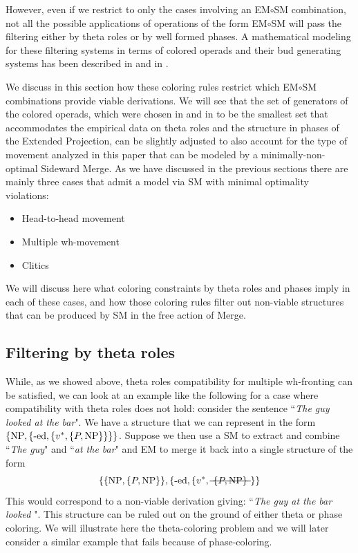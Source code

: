 \documentclass[12pt]{amsart}
\numberwithin{equation}{section}
\begin{document}
\smallskip

However, even if we restrict to only the cases involving an EM$\circ$SM combination, 
not all the possible applications of operations of the form EM$\circ$SM
will pass the filtering either by theta roles or by well formed phases. A mathematical modeling
for these filtering systems in terms of colored operads and their bud generating systems 
has been described in \cite{MarLar} and in \cite{MHL}. 

We discuss in this section how these coloring rules restrict which EM$\circ$SM
combinations provide viable derivations. We will see that the set of generators
of the colored operads, which were chosen in \cite{MarLar} and in \cite{MHL} to
be the smallest set that accommodates the empirical data on theta roles and
the structure in phases of the Extended Projection, can be slightly adjusted to
also account for the type of movement analyzed in this paper that can be
modeled by a minimally-non-optimal Sideward Merge. As we have discussed
in the previous sections there are mainly three cases that admit a model via SM
with minimal optimality violations:
\begin{itemize}
\item Head-to-head movement
\item Multiple wh-movement
\item Clitics 
\end{itemize}

We will discuss here what coloring constraints by theta roles and
phases imply in each of these cases, and how those coloring rules
filter out non-viable structures that can be produced by SM in the free
action of Merge. 

\subsection{Filtering by theta roles}\label{ThetaEMSMsec}

While, as we showed above, 
theta roles compatibility for multiple wh-fronting can be satisfied, we can look at an
example like the following for a case where compatibility with theta roles does not hold:
consider the sentence ``{\em The guy looked at the bar}". We have a structure that
we can represent in the form $\{  {\rm NP} , \{ \text{-ed}, \{ v^*, \{ P, {\rm NP} \} \} \} \}$.
Suppose we then use a SM to extract and combine ``{\em The guy}" and ``{\em at the bar}"
and EM to merge it back into a single structure of the form
$$  \{ \{ {\rm NP} , \{ P, {\rm NP} \} \}  , \{ \text{-ed}, \{ v^*,  \text{\sout{ $\{ P, {\rm NP} \} $ }} \} \} $$
This would correspond to a non-viable derivation giving:  ``{\em The guy at the bar looked }".
This structure can be ruled out on the ground of either theta or phase coloring. We will illustrate here the
theta-coloring problem and we will later consider a similar example that fails  because of phase-coloring.
\end{document}
